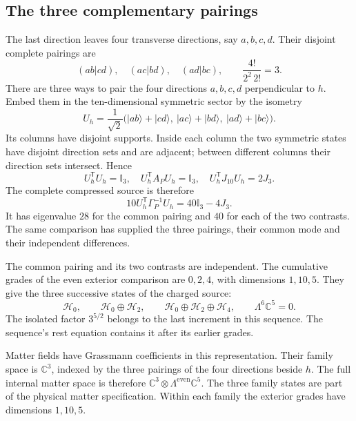 \documentclass[aps,prx,onecolumn,10pt,notitlepage,nofootinbib,longbibliography]{revtex4-2}
\numberwithin{equation}{section}
\numberwithin{table}{section}
\newcommand{\Id}{\mathbb I}
\newcommand{\CC}{\mathbb C}
\begin{document}
\subsection{The three complementary pairings}
The last direction leaves four transverse directions, say $a,b,c,d$.
Their disjoint complete pairings are
\begin{equation}
 (ab|cd),\quad(ac|bd),\quad(ad|bc),\qquad
 \frac{4!}{2^2\,2!}=3.
 \label{eq:threepairings}
\end{equation}
There are three ways to pair the four directions $a,b,c,d$ perpendicular to $h$. Embed them in the ten-dimensional symmetric sector by the isometry
\begin{equation}
 U_h=\frac1{\sqrt2}
 \bigl(\lvert ab\rangle+\lvert cd\rangle,\ \lvert ac\rangle+\lvert bd\rangle,\ \lvert ad\rangle+\lvert bc\rangle\bigr).
 \label{eq:pairingisometry}
\end{equation}
Its columns have disjoint supports. Inside each column the two symmetric states have disjoint direction sets and are adjacent; between different columns their direction sets intersect. Hence
\begin{equation}
 U_h^{\mathsf T}U_h=\Id_3,\quad
 U_h^{\mathsf T}A_PU_h=\Id_3,\quad
 U_h^{\mathsf T}J_{10}U_h=2J_3.
\end{equation}
The complete compressed source is therefore
\begin{equation}
 10U_h^{\mathsf T}\Gamma_P^{-1}U_h=40\Id_3-4J_3.
 \label{eq:pairingcompression}
\end{equation}
It has eigenvalue $28$ for the common pairing and $40$ for each of the two contrasts. The same comparison has supplied the three pairings, their common mode and their independent differences.

The common pairing and its two contrasts are independent. The cumulative
grades of the even exterior comparison are $0,2,4$, with dimensions
$1,10,5$. They give the three successive states of the charged source:
\begin{equation}
 \mathcal H_0,\qquad \mathcal H_0\oplus\mathcal H_2,\qquad
 \mathcal H_0\oplus\mathcal H_2\oplus\mathcal H_4,
 \qquad \Lambda^6\CC^5=0.
 \label{eq:threecumulativegrades}
\end{equation}
The isolated factor $3^{5/2}$ belongs to the last increment in this sequence.
The sequence's rest equation contains it after its earlier grades.

Matter fields have Grassmann coefficients in this representation. Their family space is $\CC^3$, indexed by the three pairings of the four directions beside $h$. The full internal matter space is therefore $\CC^3\otimes\Lambda^{\mathrm{even}}\CC^5$. The three family states are part of the physical matter specification. Within each family the exterior grades have dimensions $1,10,5$.
\end{document}
